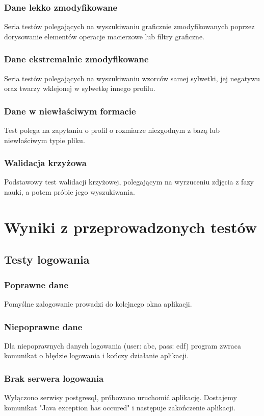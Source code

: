 \documentclass[]{article}
\begin{document}
\subsubsection{Dane lekko zmodyfikowane}
Seria testów polegających na wyszukiwaniu graficznie zmodyfikowanych poprzez dorysowanie elementów operacje macierzowe lub filtry graficzne.
\subsubsection{Dane ekstremalnie zmodyfikowane}
Seria testów polegających na wyszukiwaniu wzorców samej sylwetki, jej negatywu oraz twarzy wklejonej w sylwetkę innego profilu.
\subsubsection{Dane w niewłaściwym formacie}
Test polega na zapytaniu o profil o rozmiarze niezgodnym z bazą lub niewłaściwym typie pliku.
\subsubsection{Walidacja krzyżowa}
Podstawowy test walidacji krzyżowej, polegającym na wyrzuceniu zdjęcia z fazy nauki, a potem próbie jego wyszukiwania.

\section[Wyniki]{Wyniki z przeprowadzonych testów}
\subsection{Testy logowania}
\subsubsection{Poprawne dane}
Pomyślne zalogowanie prowadzi do kolejnego okna aplikacji.
\subsubsection{Niepoprawne dane}
Dla niepoprawnych danych logowania (user: abc, pass: edf) program zwraca komunikat o błędzie logowania i kończy działanie aplikacji.
\subsubsection{Brak serwera logowania}
Wyłączono serwisy postgresql, próbowano uruchomić aplikację. Dostajemy komunikat "Java exception has occured" i następuje zakończenie aplikacji.
\end{document}
